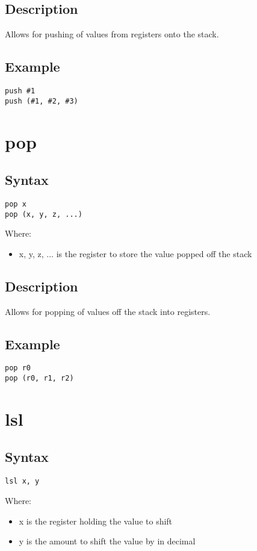 \documentclass[11pt]{scrartcl}
\begin{document}
\subsection{Description}
Allows for pushing of values from registers onto the stack.
\subsection{Example}
\begin{verbatim}
push #1
push (#1, #2, #3)
\end{verbatim}

\section{pop}
\subsection{Syntax}
\begin{verbatim}
pop x
pop (x, y, z, ...)
\end{verbatim}
Where:
\begin{itemize}
    \item x, y, z, ... is the register to store the value popped off the stack
\end{itemize}
\subsection{Description}
Allows for popping of values off the stack into registers.
\subsection{Example}
\begin{verbatim}
pop r0
pop (r0, r1, r2)
\end{verbatim}

\section{lsl}
\subsection{Syntax}
\begin{verbatim}
lsl x, y
\end{verbatim}
Where:
\begin{itemize}
    \item x is the register holding the value to shift
    \item y is the amount to shift the value by in decimal
\end{itemize}
\end{document}
